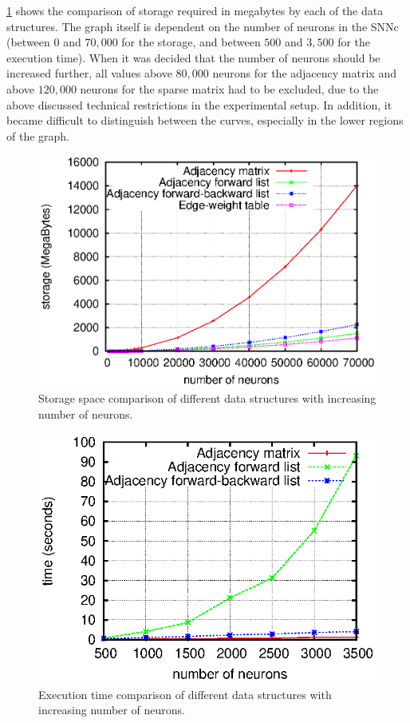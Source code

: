 \figurename \ref{fig:storage_comp} shows the comparison of storage required in megabytes by each of the data structures. The graph itself is dependent on the number of neurons in the SNNc (between $0$ and $70,000$ for the storage, and between $500$ and $3,500$ for the execution time). When it was decided that the number of neurons should be increased further, all values above $80,000$ neurons for the adjacency matrix and above $120,000$ neurons for the sparse matrix had to be excluded, due to the above discussed technical restrictions in the experimental setup. In addition, it became difficult to distinguish between the curves, especially in the lower regions of the graph.

\begin{figure}
	\centering
	\includegraphics[width=0.8\linewidth]{fig/largesnn/storage.eps}
	\caption{Storage space comparison of different data structures with increasing number of neurons.}
	\label{fig:storage_comp}
\end{figure}

\begin{figure}
	\centering
	\includegraphics[width=0.8\linewidth]{fig/largesnn/time.eps}
	\caption{Execution time comparison of different data structures with increasing number of neurons.}
	\label{fig:time_comp}
\end{figure}

